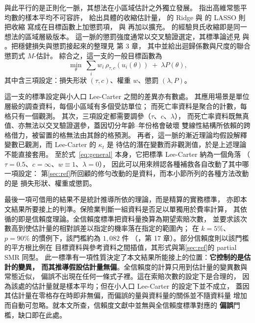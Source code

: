 \documentclass[UTF8, fontset=macnew, a4paper, 12pt]{ctexart}
\begin{document}
與此平行的是正則化一脈，其想法在小區域估計之外獨立發展。
\citet{stein1956} 指出高維常態平均數的樣本平均不可容許，
\citet{james1961} 給出具體的收縮估計量，
\citet{hoerl1970} 的 Ridge 與 \citet{tibshirani1996} 的 LASSO 則把收縮
寫成在目標函數上加懲罰項，\citet{zou2005} 與 \citet{zou2006} 再加以擴充。
\citet{fay1979} 的經驗貝氏收縮即是同一想法的區域層級版本。
這一脈的懲罰強度通常以交叉驗證選定，其標準論述見 \citet{buhlmann2011} 與
\citet{hastie2015}。把穩健損失與懲罰接起來的整理見 \citet{zoubir2018} 第 3 章，
其中並給出迴歸係數與尺度的聯合懲罰式 $M$-估計。
綜合之，這一支的一般目標函數為
\begin{equation}\label{eq:general}
\min_{\theta}\ \sum_{i} w_i\,\rho_{\tau,c}(u_i(\theta))\;+\;\lambda P(\theta),
\end{equation}
其中含三項設定：損失形狀 $(\tau,c)$、權重 $w$、懲罰 $(\lambda,P)$。

這一支的標準設定與小人口 Lee-Carter 之間的差異亦有數處。
其應用場景是單位層級的調查資料，每個小區域有多個受訪單位；
而死亡率資料是聚合的計數，每格只有一個觀測。
其次，三項設定都需要調參（$\tau$、$c$、$\lambda$），
而死亡率資料既無真值、亦無法以交叉驗證選參，蓋因切分年齡--年份格會破壞
雙線性結構所依賴的跨格借力，被留置的格無法由其餘的格預測。
再者，這一脈的漸近理論均假設解釋變數已觀測，而 Lee-Carter 的 $\kappa_t$ 是
待估的潛在變數而非觀測值，於是上述理論不能直接套用。
至於式~\eqref{eq:general} 本身，它把標準 Lee-Carter 納為一個角落
（$\tau=0.5$、$c=\infty$、$w\equiv1$、$\lambda=0$），
因此可以用來辨認各種補救各自改動了其中哪一項設定：
第\ref{sec:ref}所回顧的修勻改動的是資料，而本小節所列的各種方法改動的是
損失形狀、權重或懲罰。

最後一項可借用的結果不是統計推導所依的理論，而是精算的實務標準，
亦即本文結果所要接上的判準。保險業判斷一組資料是否足以單獨用於費率計算，
其依循的即是信賴度理論。全信賴度標準把資料量換算為期望索賠次數，
並要求該次數高到使估計量的相對誤差以指定的機率落在指定的範圍內；
在 $k=5\%$、$p=90\%$ 的慣例下，該門檻約為 $1{,}082$ 件
（\citealp{klugman2012}，第 17 章）。部分信賴度則以該門檻的平方根比例在
目標資料與參考資料之間插值，其形式與第\ref{sec:ref}的 partial SMR 同型。
此一標準有一項性質決定了本文結果所能接上的位置：\textbf{它控制的是估計的變異，
而其推導假設估計量無偏}。全信賴度的計算只用到估計量的變異數與常態近似，
偏誤不出現在任何一條式子裡。這在索賠次數的設定下是合理的，
因為該處的估計量就是樣本平均；但在小人口 Lee-Carter 的設定下並不成立，
蓋因其估計量在零格存在時即非無偏，而偏誤的量與資料量的關係並不隨資料量
增加而自動可忽略。就本文所查，信賴度文獻中並無與全信賴度標準對應的
\textbf{偏誤}門檻，缺口即在此處。
\end{document}
